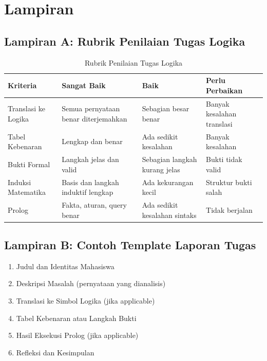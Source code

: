 \chapter*{Lampiran}

\section*{Lampiran A: Rubrik Penilaian Tugas Logika}

\begin{table}[h]
\centering
\small
\begin{tabular}{|>{\raggedright\arraybackslash}p{3cm}|>{\raggedright\arraybackslash}p{3.5cm}|>{\raggedright\arraybackslash}p{3.5cm}|>{\raggedright\arraybackslash}p{3.5cm}|}
\hline
\textbf{Kriteria} & \textbf{Sangat Baik} & \textbf{Baik} & \textbf{Perlu Perbaikan} \\
\hline
Translasi ke Logika & Semua pernyataan benar diterjemahkan & Sebagian besar benar & Banyak kesalahan translasi \\
\hline
Tabel Kebenaran & Lengkap dan benar & Ada sedikit kesalahan & Banyak kesalahan \\
\hline
Bukti Formal & Langkah jelas dan valid & Sebagian langkah kurang jelas & Bukti tidak valid \\
\hline
Induksi Matematika & Basis dan langkah induktif lengkap & Ada kekurangan kecil & Struktur bukti salah \\
\hline
Prolog & Fakta, aturan, query benar & Ada sedikit kesalahan sintaks & Tidak berjalan \\
\hline
\end{tabular}
\caption{Rubrik Penilaian Tugas Logika}
\end{table}

\section*{Lampiran B: Contoh Template Laporan Tugas}
\begin{enumerate}
  \item Judul dan Identitas Mahasiswa
  \item Deskripsi Masalah (pernyataan yang dianalisis)
  \item Translasi ke Simbol Logika (jika applicable)
  \item Tabel Kebenaran atau Langkah Bukti
  \item Hasil Eksekusi Prolog (jika applicable)
  \item Refleksi dan Kesimpulan
\end{enumerate}

